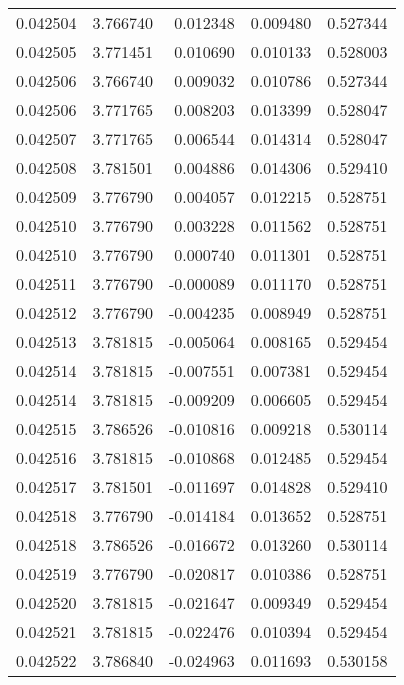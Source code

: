 \begin{tabular}{lrrrr}
0.042504    &  3.766740 &  0.012348 &  0.009480 &             0.527344 \\
0.042505    &  3.771451 &  0.010690 &  0.010133 &             0.528003 \\
0.042506    &  3.766740 &  0.009032 &  0.010786 &             0.527344 \\
0.042506    &  3.771765 &  0.008203 &  0.013399 &             0.528047 \\
0.042507    &  3.771765 &  0.006544 &  0.014314 &             0.528047 \\
0.042508    &  3.781501 &  0.004886 &  0.014306 &             0.529410 \\
0.042509    &  3.776790 &  0.004057 &  0.012215 &             0.528751 \\
0.042510    &  3.776790 &  0.003228 &  0.011562 &             0.528751 \\
0.042510    &  3.776790 &  0.000740 &  0.011301 &             0.528751 \\
0.042511    &  3.776790 & -0.000089 &  0.011170 &             0.528751 \\
0.042512    &  3.776790 & -0.004235 &  0.008949 &             0.528751 \\
0.042513    &  3.781815 & -0.005064 &  0.008165 &             0.529454 \\
0.042514    &  3.781815 & -0.007551 &  0.007381 &             0.529454 \\
0.042514    &  3.781815 & -0.009209 &  0.006605 &             0.529454 \\
0.042515    &  3.786526 & -0.010816 &  0.009218 &             0.530114 \\
0.042516    &  3.781815 & -0.010868 &  0.012485 &             0.529454 \\
0.042517    &  3.781501 & -0.011697 &  0.014828 &             0.529410 \\
0.042518    &  3.776790 & -0.014184 &  0.013652 &             0.528751 \\
0.042518    &  3.786526 & -0.016672 &  0.013260 &             0.530114 \\
0.042519    &  3.776790 & -0.020817 &  0.010386 &             0.528751 \\
0.042520    &  3.781815 & -0.021647 &  0.009349 &             0.529454 \\
0.042521    &  3.781815 & -0.022476 &  0.010394 &             0.529454 \\
0.042522    &  3.786840 & -0.024963 &  0.011693 &             0.530158 \\

\end{tabular}
